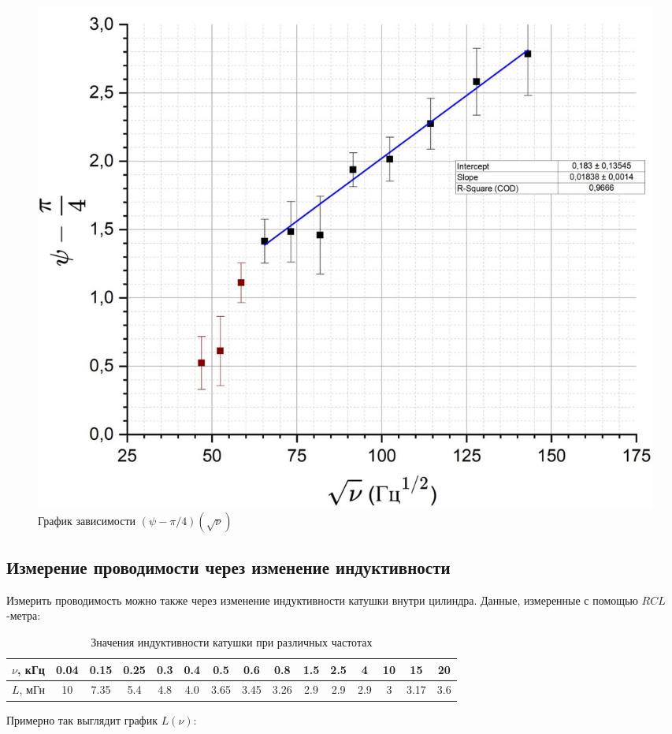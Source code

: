 \documentclass{article}
\begin{document}
	\begin{figure}[h]
		\centering
		\includegraphics[width=\textwidth]{15_13_30.png}
		\caption{График зависимости $(\psi - \pi/4)(\sqrt{\nu})$}
		\newpage
	\end{figure}
	
	\subsection*{Измерение проводимости через изменение индуктивности}
	Измерить проводимость можно также через изменение индуктивности катушки внутри цилиндра. Данные, измеренные с помощью $RCL$-метра:
	
	\begin{table}[h!]
		\centering
		\begin{tabular}{|c|c|c|c|c|c|c|c|c|c|c|c|c|c|c|}
			\hline
			$\nu$, кГц & 0.04 & 0.15 & 0.25 & 0.3 & 0.4 & 0.5 & 0.6 & 0.8 & 1.5 & 2.5 & 4 & 10 & 15 & 20 \\
			\hline
			$L$, мГн & 10 & 7.35 & 5.4 & 4.8 & 4.0  & 3.65 & 3.45 & 3.26 & 2.9 & 2.9 & 2.9 & 3 & 3.17 & 3.6 \\
			\hline
		\end{tabular}
		\caption{Значения индуктивности катушки при различных частотах}
	\end{table}
	
	Примерно так выглядит график $L(\nu)$:
	
\end{document}
